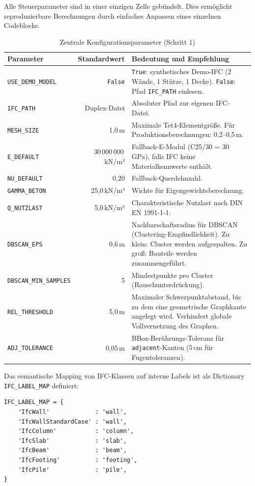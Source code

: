 \documentclass[a4paper,11pt]{article}
\begin{document}
Alle Steuerparameter sind in einer einzigen Zelle gebündelt. Dies ermöglicht reproduzierbare Berechnungen durch einfaches Anpassen eines einzelnen Codeblocks.

\begin{table}[H]
\centering
\caption{Zentrale Konfigurationsparameter (Schritt 1)}
\begin{tabular}{p{5cm}rp{7cm}}
\toprule
\textbf{Parameter} & \textbf{Standardwert} & \textbf{Bedeutung und Empfehlung} \\
\midrule
\texttt{USE\_DEMO\_MODEL} & \texttt{False} & \texttt{True}: synthetisches Demo-IFC (2 Wände, 1 Stütze, 1 Decke). \texttt{False}: Pfad \texttt{IFC\_PATH} einlesen. \\
\texttt{IFC\_PATH} & Duplex-Datei & Absoluter Pfad zur eigenen IFC-Datei. \\
\texttt{MESH\_SIZE} & 1{,}0\,m & Maximale Tet4-Elementgröße. Für Produktionsberechnungen: 0{,}2–0{,}5\,m. \\
\texttt{E\_DEFAULT} & 30\,000\,000\,kN/m² & Fallback-E-Modul (C25/30 = 30\,GPa), falls IFC keine Materialkennwerte enthält. \\
\texttt{NU\_DEFAULT} & 0{,}20 & Fallback-Querdehnzahl. \\
\texttt{GAMMA\_BETON} & 25{,}0\,kN/m³ & Wichte für Eigengewichtsberechnung. \\
\texttt{Q\_NUTZLAST} & 5{,}0\,kN/m² & Charakteristische Nutzlast nach DIN EN 1991-1-1. \\
\texttt{DBSCAN\_EPS} & 0{,}6\,m & Nachbarschaftsradius für DBSCAN (Clustering-Empfindlichkeit). Zu klein: Cluster werden aufgespalten. Zu groß: Bauteile werden zusammengeführt. \\
\texttt{DBSCAN\_MIN\_SAMPLES} & 5 & Mindestpunkte pro Cluster (Rauschunterdrückung). \\
\texttt{REL\_THRESHOLD} & 5{,}0\,m & Maximaler Schwerpunktabstand, bis zu dem eine geometrische Graphkante angelegt wird. Verhindert globale Vollvernetzung des Graphen. \\
\texttt{ADJ\_TOLERANCE} & 0{,}05\,m & BBox-Berührungs-Toleranz für \texttt{adjacent}-Kanten (5\,cm für Fugentoleranzen). \\
\bottomrule
\end{tabular}
\end{table}

Das semantische Mapping von IFC-Klassen auf interne Labels ist als Dictionary \texttt{IFC\_LABEL\_MAP} definiert:

\begin{lstlisting}[numbers=none, caption={IFC-Klassen-Mapping}]
IFC_LABEL_MAP = {
    'IfcWall'             : 'wall',
    'IfcWallStandardCase' : 'wall',
    'IfcColumn'           : 'column',
    'IfcSlab'             : 'slab',
    'IfcBeam'             : 'beam',
    'IfcFooting'          : 'footing',
    'IfcPile'             : 'pile',
}
\end{lstlisting}
\end{document}
